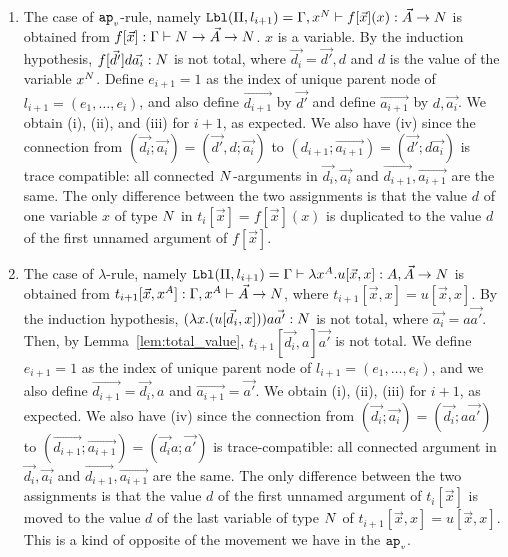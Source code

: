 \documentclass{article}
\newenvironment{proof}[1][Proof]{\begin{trivlist}
\item[\hskip \labelsep {\bfseries #1}]}{\end{trivlist}}
\begin{document}
\begin{proof}
\begin{enumerate}
\item
  The case of ${{\tt ap}_{\mbox{\tiny $v$}}}$-rule, namely 
  ${\tt Lbl}(\Pi,l_{i+1}) 
    = 
   \Gamma,x^{N}\vdash f[\vec{x}](x):  \vec{A}\rightarrow{N}$ is obtained from
  $f[\vec{x}]:\Gamma\vdash N\rightarrow \vec{A} \rightarrow {N}$. $x$ is a variable.
  By the induction hypothesis, $f[\vec{d'}]d\vec{a_i}:{N}$ is not total,
  where $\vec{d_i} = \vec{d'},d$ and $d$ is the value of the variable $x^{N}$.
  Define $e_{i+1}=1$ as the index of unique parent node of $l_{i+1}=(e_1,\ldots,e_i)$, and
  also define $\vec{d_{i+1}}$ by $\vec{d'}$ and define $\vec{a_{i+1}}$ by $d,\vec{a_i}$. 
  We obtain (i), (ii), and (iii) for $i+1$, as expected.
  We also have (iv) since the connection from
  $(\vec{d_i};\vec{a_i}) = (\vec{d'},d;\vec{a_i})$ to
  $(d_{i+1};\vec{a_{i+1}}) = (\vec{d'};d\vec{a_i})$
  is trace compatible: all connected ${N}$-arguments in $\vec{d_{i}},\vec{a_{i}}$ and 
  $\vec{d_{i+1}},\vec{a_{i+1}}$ are the same.  
 The only difference between the two assignments
  is that the value $d$ of one variable $x$ of type ${N}$ 
 in $t_i[\vec{x}]=f[\vec{x}](x)$ is duplicated to the value $d$ 
  of the first unnamed argument of $ f[\vec{x}]$. 

\item
  The case of $\lambda$-rule, namely
  ${\tt Lbl}(\Pi,l_{i+1}) = 
    \Gamma\vdash \lambda x^A.u[\vec{x},x] : A, \vec{A} \rightarrow {N}$ is obtained from
  $t_{i+1}[\vec{x},x^A]:\Gamma,x^A\vdash \vec{A}\rightarrow{N}$, 
  where $t_{i+1}[\vec{x},x]=u[\vec{x},x]$.
  By the induction hypothesis, $(\lambda x.(u[\vec{d_i},x]))a\vec{a'}:{N}$ is not total,
  where $\vec{a_i} = a\vec{a'}$.
  Then, by Lemma~\ref{lem:total_value}, $t_{i+1}[\vec{d_i},a]\vec{a'}$ is not total. 
  We define $e_{i+1}=1$ as the index of unique parent node of $l_{i+1}=(e_1,\ldots,e_i)$,
  and we also define $\vec{d_{i+1}} = \vec{d_i},a$ and $\vec{a_{i+1}} = \vec{a'}$. 
  We obtain (i), (ii), (iii) for $i+1$, as expected.
  We also have (iv) since the connection from 
  $(\vec{d_i};\vec{a_i}) = (\vec{d_i};a\vec{a'})$ to $(\vec{d_{i+1}};\vec{a_{i+1}}) = (\vec{d_i}a;
    \vec{a'})$ is trace-compatible: all connected argument in $\vec{d_{i}},\vec{a_{i}}$ and 
  $\vec{d_{i+1}},\vec{a_{i+1}}$ are the same. The only difference between the two assignments
  is that the value $d$ of the first unnamed argument of $t_i[\vec{x}]$ is moved to the value $d$
  of the last variable of type ${N}$ of $t_{i+1}[\vec{x},x]=u[\vec{x},x]$.
  This is a kind of opposite of the movement we have in the ${{\tt ap}_{\mbox{\tiny $v$}}}$.


\end{enumerate}
\end{proof}
\end{document}
